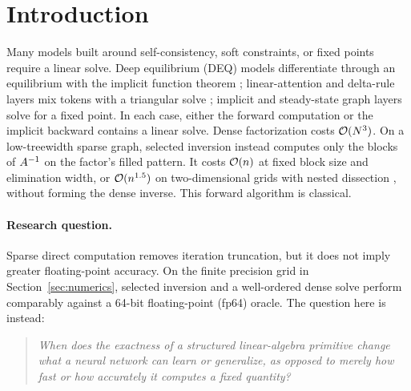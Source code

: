 \section{Introduction}
\label{sec:intro}

Many models built around self-consistency, soft constraints, or fixed points
require a linear solve. Deep equilibrium (DEQ) models differentiate through an
equilibrium with the implicit function theorem \citep{bai2019deep};
linear-attention and delta-rule layers mix tokens with a triangular solve
\citep{yang2024parallelizing}; implicit and steady-state graph layers solve for
a fixed point. In each case, either the forward computation or the implicit
backward contains a linear solve. Dense factorization costs $\mathcal{O}(N^3)$.
On a low-treewidth sparse graph, selected inversion instead computes only the
blocks of $A^{-1}$ on the factor's filled pattern. It costs $\mathcal{O}(n)$ at fixed
block size and elimination width, or $\mathcal{O}(n^{1.5})$ on two-dimensional grids
with nested dissection \citep{george1973nested,takahashi1973,erismantinney1975},
without forming the dense inverse. This forward algorithm is classical.

\paragraph{Research question.}
Sparse direct computation removes iteration truncation, but it does not imply
greater floating-point accuracy. On the finite precision grid in
Section~\ref{sec:numerics}, selected inversion and a well-ordered dense solve
perform comparably against a 64-bit floating-point (fp64) oracle. The question
here is instead:
\begin{quote}
\emph{When does the exactness of a structured linear-algebra primitive change
what a neural network can learn or generalize, as opposed to merely how fast
or how accurately it computes a fixed quantity?}
\end{quote}

